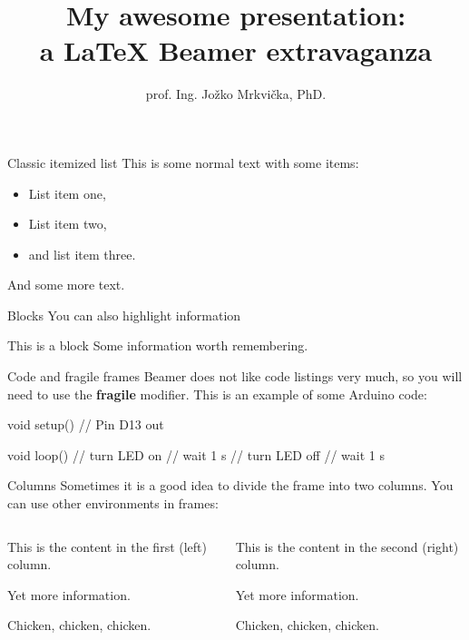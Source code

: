 \documentclass{beamer}
\title[Event or Presentation title] %
{My awesome presentation:\\ a LaTeX Beamer extravaganza}
\author[] %
{prof. Ing. Jo\v{z}ko Mrkvi\v{c}ka, PhD.}
\date[13.04.2018] %
{}
\begin{document}
\lstset{aboveskip=3pt, belowskip=3pt} %
\begin{frame}%
  \titlepage
\end{frame}


\begin{frame}{Classic itemized list}
This is some normal text with some items:
  \begin{itemize}
    \item List item one,
    \item List item two,
    \item and list item three.
  \end{itemize}
  And some more text.
\end{frame}

\begin{frame}{Blocks}
You can also highlight information
\begin{block}{This is a block}
Some information worth remembering.
\end{block}
\end{frame}



\begin{frame}[fragile]{Code and fragile frames}
Beamer does not like code listings very much, so you will need to use the {\bf fragile} modifier. This is an example of some Arduino code:
\begin{ardu}
void setup() {
     // Pin D13 out
}

void loop() {
     // turn LED on
     // wait 1 s
     // turn LED off
     // wait 1 s
}
\end{ardu}
\end{frame}


\begin{frame}{Columns}
Sometimes it is a good idea to divide the frame into two columns. You can use other environments in frames:
\begin{columns}[T] %
\begin{column}{.48\textwidth}
This is the content in the first (left) column.

Yet more information.

Chicken, chicken, chicken.
\end{column}
\begin{column}{.48\textwidth}
This is the content in the second (right) column.

Yet more information.


Chicken, chicken, chicken.
\end{column}%
\end{columns}
\end{frame}
\end{document}
